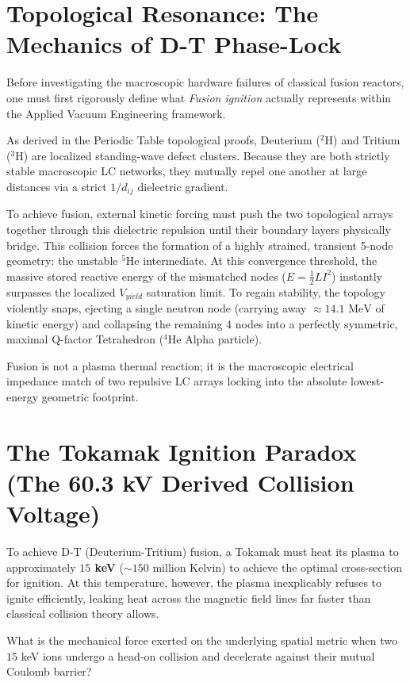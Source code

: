 \section{Topological Resonance: The Mechanics of D-T Phase-Lock}

Before investigating the macroscopic hardware failures of classical fusion reactors, one must first rigorously define what \textit{Fusion ignition} actually represents within the Applied Vacuum Engineering framework. 

As derived in the Periodic Table topological proofs, Deuterium ($^2$H) and Tritium ($^3$H) are localized standing-wave defect clusters. Because they are both strictly stable macroscopic LC networks, they mutually repel one another at large distances via a strict $1/d_{ij}$ dielectric gradient.

To achieve fusion, external kinetic forcing must push the two topological arrays together through this dielectric repulsion until their boundary layers physically bridge. This collision forces the formation of a highly strained, transient 5-node geometry: the unstable $^5$He intermediate.
At this convergence threshold, the massive stored reactive energy of the mismatched nodes ($E = \frac{1}{2}LI^2$) instantly surpasses the localized $V_{yield}$ saturation limit. To regain stability, the topology violently snaps, ejecting a single neutron node (carrying away $\approx 14.1\text{ MeV}$ of kinetic energy) and collapsing the remaining 4 nodes into a perfectly symmetric, maximal Q-factor Tetrahedron ($^4$He Alpha particle).

Fusion is not a plasma thermal reaction; it is the macroscopic electrical impedance match of two repulsive LC arrays locking into the absolute lowest-energy geometric footprint.

\section{The Tokamak Ignition Paradox (The 60.3 kV Derived Collision Voltage)}To achieve D-T (Deuterium-Tritium) fusion, a Tokamak must heat its plasma to approximately \textbf{$15$ keV} ($\sim 150$ million Kelvin) to achieve the optimal cross-section for ignition. At this temperature, however, the plasma inexplicably refuses to ignite efficiently, leaking heat across the magnetic field lines far faster than classical collision theory allows.

What is the mechanical force exerted on the underlying spatial metric when two $15$ keV ions undergo a head-on collision and decelerate against their mutual Coulomb barrier? 

